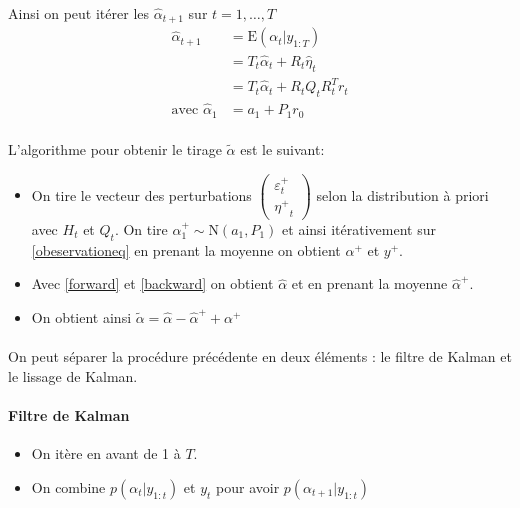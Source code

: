 \documentclass{article}
\theoremstyle{definition}
\theoremstyle{remark}
\begin{document}
{\begin{equation}
        \end{equation}
        Ainsi on peut itérer les $\hat{\alpha}_{t+1}$ sur $t=1, \ldots, T$
\begin{equation}
    \label{forward}
    \begin{aligned}
		\hat{\alpha}_{t+1}&=\mathrm{E}\left(\alpha_{t} | y_{1: T}\right) \\
		 &= T_{t} \hat{\alpha}_{t}+R_{t}\hat{\eta}_t \\
        &= T_{t} \hat{\alpha}_{t}+R_{t} Q_{t} R_{t}^{T} r_{t}\\
        \text{avec }\hat{\alpha}_{1} &= a_{1}+P_{1} r_{0}
    \end{aligned}
\end{equation}

\paragraph{}
L'algorithme pour obtenir le tirage $\tilde{\alpha}$ est le suivant:
\begin{itemize}[label={$\bullet$}]
\item On tire le vecteur des perturbations  $\left(\begin{array}{c}{
    \varepsilon_t^+} \\ 
    {\eta^+}_t\end{array}
    \right)$   
selon la distribution à priori avec $H_t$ et $Q_t$. On tire $\alpha_{1}^{+} \sim \mathrm{N}\left(a_{1}, P_{1}\right)$ et ainsi 
itérativement sur \ref{obeservationeq} en prenant la moyenne on obtient $\alpha^+$ et $y^+$.
\item Avec \ref{forward} et \ref{backward} on obtient $\hat{\alpha}$ et en prenant la moyenne $\hat{\alpha}^+$.
\item On obtient ainsi $\tilde{\alpha}=\hat{\alpha}-\hat{\alpha}^{+}+\alpha^{+}$
\end{itemize}

\paragraph{}
On peut séparer la procédure précédente en deux éléments : le filtre de Kalman et le lissage de Kalman.

\paragraph{Filtre de Kalman}
\begin{itemize}
\item On itère en avant de 1 à $T$.
\item On combine $p\left(\alpha_{t} | y_{1: t}\right)$ et $y_t$ pour avoir $p\left(\alpha_{t+1} | y_{1: t}\right)$
\end{itemize}

}
\end{document}
